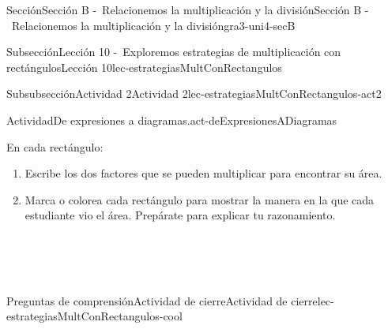 \begin{sectionptx}{Sección}{Sección B -~Relacionemos la multiplicación y la división}{}{Sección B -~Relacionemos la multiplicación y la división}{}{}{gra3-uni4-secB}
\begin{subsectionptx}{Subsección}{Lección 10 -~Exploremos estrategias de multiplicación con rectángulos}{}{Lección 10}{}{}{lec-estrategiasMultConRectangulos}
\begin{subsubsectionptx}{Subsubsección}{Actividad 2}{}{Actividad 2}{}{}{lec-estrategiasMultConRectangulos-act2}
\begin{activity}{Actividad}{De expresiones a diagramas.}{act-deExpresionesADiagramas}
\begin{sidebyside}{3}{0.0166666666666667}{0.0166666666666667}{0.0333333333333333}
\end{sidebyside}%
\par
En cada rectángulo:%
%
\begin{enumerate}
\item{}Escribe los dos factores que se pueden multiplicar para encontrar su área.%
\item{}Marca o colorea cada rectángulo para mostrar la manera en la que cada estudiante vio el área. Prepárate para explicar tu razonamiento.%
\begin{image}{0}{1}{0}{}%
\includegraphics[max width=\linewidth, center]{external/whitespace-tikz/1cm.pdf}
\end{image}%
\end{enumerate}
\end{activity}%
\end{subsubsectionptx}
%
%
\typeout{************************************************}
\typeout{************************************************}
%
\begin{reading-questions-subsubsection}{Preguntas de comprensión}{Actividad de cierre}{}{Actividad de cierre}{}{}{lec-estrategiasMultConRectangulos-cool}
%
\end{reading-questions-subsubsection}
\end{subsectionptx}
%
%
\typeout{************************************************}
\typeout{************************************************}
%
\begin{subsectionptx}{Subsección}{Lección 11 -~Estrategias de multiplicación para rectángulos sin cuadrícula}{}{Lección 11}{}{}{lec-estrategiasMultRectangulosSinCuadricula}
%
%
\typeout{************************************************}
\typeout{************************************
\end{subsectionptx}
\end{sectionptx}
